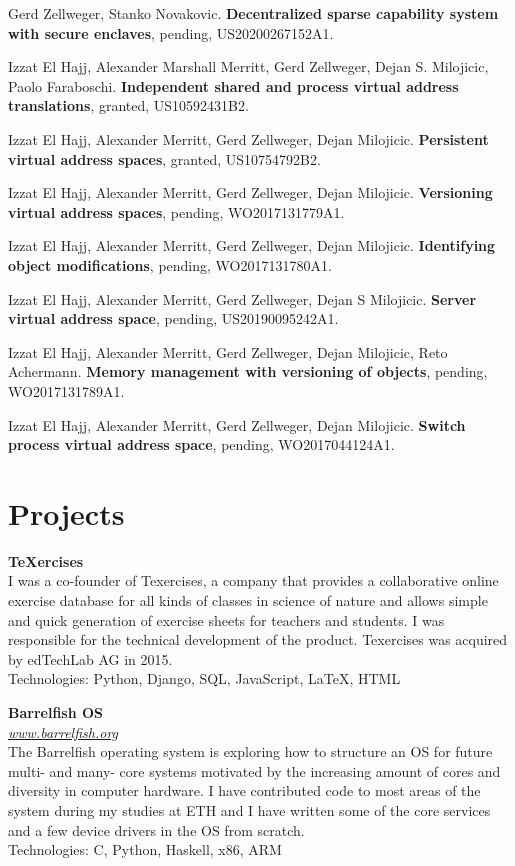 \documentclass[margin,line]{cv/cv}
\begin{document}
\begin{resume}
    Gerd Zellweger, Stanko Novakovic.
    \textbf{Decentralized sparse capability system with secure enclaves},
    pending, US20200267152A1.

    Izzat El Hajj, Alexander Marshall Merritt, Gerd Zellweger, Dejan S. Milojicic, Paolo Faraboschi.
    \textbf{Independent shared and process virtual address translations},
    granted, US10592431B2.

    Izzat El Hajj, Alexander Merritt, Gerd Zellweger, Dejan Milojicic.
    \textbf{Persistent virtual address spaces},
    granted, US10754792B2.

    Izzat El Hajj, Alexander Merritt, Gerd Zellweger, Dejan Milojicic.
    \textbf{Versioning virtual address spaces},
    pending, WO2017131779A1.

    Izzat El Hajj, Alexander Merritt, Gerd Zellweger, Dejan Milojicic.
    \textbf{Identifying object modifications},
    pending, WO2017131780A1.

    Izzat El Hajj, Alexander Merritt, Gerd Zellweger, Dejan S Milojicic.
    \textbf{Server virtual address space},
    pending, US20190095242A1.

    Izzat El Hajj, Alexander Merritt, Gerd Zellweger, Dejan Milojicic, Reto Achermann.
    \textbf{Memory management with versioning of objects},
    pending, WO2017131789A1.

    Izzat El Hajj, Alexander Merritt, Gerd Zellweger, Dejan Milojicic.
    \textbf{Switch process virtual address space},
    pending, WO2017044124A1.

    \pagebreak

    \section{\mysidestyle Projects}
    \textbf{{\TeX}ercises} \\\vspace{1mm}%
    I was a co-founder of Texercises, a company that provides a collaborative online
    exercise database for all kinds of classes in science of nature and allows
    simple and quick generation of exercise sheets for teachers and students. I was
    responsible for the technical development of the product. Texercises was
    acquired by edTechLab AG in 2015.\\
    Technologies: Python, Django, SQL, JavaScript, LaTeX, HTML

    \textbf{Barrelfish OS} \\\vspace{1mm}%
    \textsl{\url{www.barrelfish.org}} \hfill \\
    The Barrelfish operating system is exploring how to structure an OS for future
    multi- and many- core systems motivated by the increasing amount of cores and
    diversity in computer hardware. I have contributed code to most areas of the
    system during my studies at ETH and I have written some of the core services
    and a few device drivers in the OS from scratch.\\ Technologies: C, Python,
    Haskell, x86, ARM


\end{resume}
\end{document}
